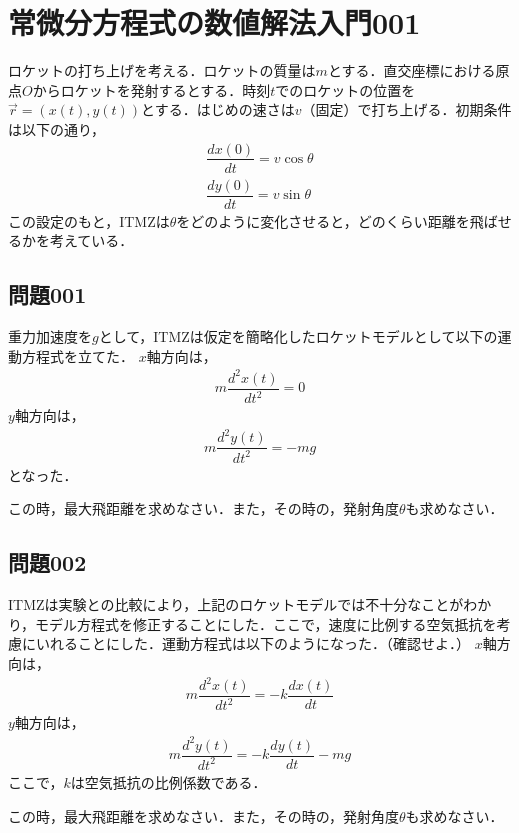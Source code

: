 \documentclass[12pt]{jarticle}
\date{}
\begin{document}

\section*{常微分方程式の数値解法入門001}
ロケットの打ち上げを考える．ロケットの質量は$m$とする．直交座標における原点$O$からロケットを発射するとする．時刻$t$でのロケットの位置を$\vec{r} = (x(t), y(t))$とする．はじめの速さは$v$（固定）で打ち上げる．初期条件は以下の通り，
%
\begin{align*}
\dfrac{dx(0)}{dt} = v \cos \theta \\
\dfrac{dy(0)}{dt} = v \sin \theta
\end{align*}
%
この設定のもと，ITMZは$\theta$をどのように変化させると，どのくらい距離を飛ばせるかを考えている．
%
\subsection*{問題001}
重力加速度を$g$として，ITMZは仮定を簡略化したロケットモデルとして以下の運動方程式を立てた．
$x$軸方向は，
\begin{align*}
m \dfrac{d^2 x(t)}{dt^2} = 0
\end{align*}
$y$軸方向は，
\begin{align*}
m \dfrac{d^2 y(t)}{dt^2} = -mg
\end{align*}
となった．

この時，最大飛距離を求めなさい．また，その時の，発射角度$\theta$も求めなさい．
%
\subsection*{問題002}
ITMZは実験との比較により，上記のロケットモデルでは不十分なことがわかり，モデル方程式を修正することにした．ここで，速度に比例する空気抵抗を考慮にいれることにした．運動方程式は以下のようになった．（確認せよ．）
$x$軸方向は，
\begin{align*}
m \dfrac{d^2 x(t)}{dt^2} = - k \dfrac{dx(t)}{dt}
\end{align*}
$y$軸方向は，
\begin{align*}
m \dfrac{d^2 y(t)}{dt^2} = - k \dfrac{dy(t)}{dt} -mg
\end{align*}
ここで，$k$は空気抵抗の比例係数である．

この時，最大飛距離を求めなさい．また，その時の，発射角度$\theta$も求めなさい．
%
\end{document}

